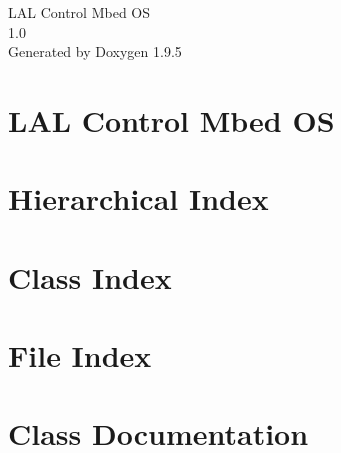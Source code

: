 \documentclass[twoside]{book}
\newcommand{\+}{\discretionary{\mbox{\scriptsize$\hookleftarrow$}}{}{}}
\newcommand{\clearemptydoublepage}{%
    \newpage{\pagestyle{empty}\cleardoublepage}%
  }
\begin{document}
  \raggedbottom
    \hypersetup{pageanchor=false,
                bookmarksnumbered=true,
                pdfencoding=unicode
               }
  \begin{titlepage}
  \vspace*{7cm}
  \begin{center}%
  {\Large LAL Control Mbed OS}\\
  [1ex]\large 1.\+0 \\
  \vspace*{1cm}
  {\large Generated by Doxygen 1.9.5}\\
  \end{center}
  \end{titlepage}
  \clearemptydoublepage
  \tableofcontents
  \clearemptydoublepage
  \hypersetup{pageanchor=true}
\chapter{LAL Control Mbed OS}
\label{index}\hypertarget{index}{}
\chapter{Hierarchical Index}

\chapter{Class Index}

\chapter{File Index}

\chapter{Class Documentation}






























\end{document}
